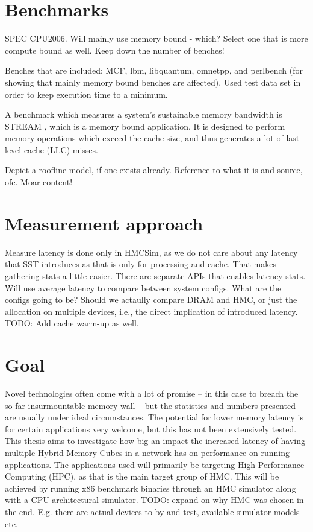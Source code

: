 
\section{Benchmarks}
SPEC CPU2006. Will mainly use memory bound - which? Select one that is more compute bound as well. Keep down the number of benches!
\bigskip

Benches that are included:
MCF, lbm, libquantum, omnetpp, and perlbench (for showing that mainly memory bound benches are affected). Used test data set in order to keep execution time to a minimum.

A benchmark which measures a system's sustainable memory bandwidth is STREAM \cite{mccalpin1995memory}, which is a memory bound application. It is designed to perform memory operations which exceed the cache size, and thus generates a lot of last level cache (LLC) misses.

Depict a roofline model, if one exists already. Reference to what it is and source, ofc. Moar content!


\section{Measurement approach}
Measure latency is done only in HMCSim, as we do not care about any latency that SST introduces as that is only for processing and cache. That makes gathering stats a little easier. There are separate APIs that enables latency stats. Will use average latency to compare between system configs. What are the configs going to be? Should we actaully compare DRAM and HMC, or just the allocation on multiple devices, i.e., the direct implication of introduced latency. TODO: Add cache warm-up as well.

\section{Goal}
Novel technologies often come with a lot of promise -- in this case to breach the so far insurmountable memory wall -- but the statistics and numbers presented are usually under ideal circumstances. The potential for lower memory latency is for certain applications very welcome, but this has not been extensively tested. This thesis aims to investigate how big an impact the increased latency of having multiple Hybrid Memory Cubes in a network has on performance on running applications. The applications used will primarily be targeting High Performance Computing (HPC), as that is the main target group of HMC. This will be achieved by running x86 benchmark binaries through an HMC simulator along with a CPU architectural simulator. TODO: expand on why HMC was chosen in the end. E.g. there are actual devices to by and test, available simulator models etc. 

